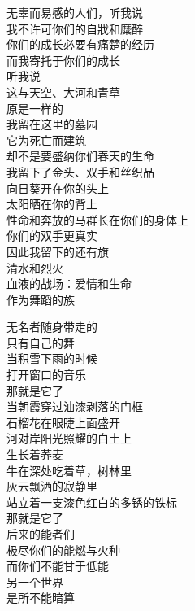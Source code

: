 \documentclass{article}
\begin{document}
无辜而易感的人们，听我说\\
我不许可你们的自戕和糜醉\\
你们的成长必要有痛楚的经历\\
而我寄托于你们的成长\\
听我说\\
这与天空、大河和青草\\
原是一样的\\
我留在这里的墓园\\
它为死亡而建筑
\\
却不是要盛纳你们春天的生命 \\ 


我留下了金头、双手和丝织品\\
向日葵开在你的头上\\
太阳晒在你的背上\\
性命和奔放的马群长在你们的身体上\\
你们的双手更真实\\
因此我留下的还有旗\\
清水和烈火
\\
血液的战场：爱情和生命 \\ 


作为舞蹈的族\\
\newpage

无名者随身带走的\\
只有自己的舞\\
当积雪下雨的时候\\
打开窗口的音乐\\
那就是它了\\
当朝霞穿过油漆剥落的门框\\
石榴花在眼睫上面盛开\\
河对岸阳光照耀的白土上\\
生长着荞麦\\
牛在深处吃着草，树林里\\
灰云飘洒的寂静里
\\
站立着一支漆色红白的多锈的铁标 \\ 


那就是它了 \\ 


后来的能者们\\
极尽你们的能燃与火种\\
而你们不能甘于低能\\
另一个世界
\\
是所不能暗算 \par \\
\newpage
\end{document}
